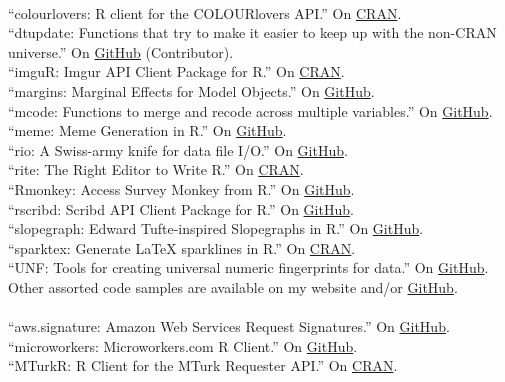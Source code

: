 \documentclass[12pt]{article}
\renewcommand{\section}[1]{\pagebreak[3]%
    \llap{\scshape\smash{\parbox[t]{\marginparwidth}{\raggedright {\color{lg}#1}}}}%
    \vspace{-\baselineskip}\par}
\newcommand{\topic}[1]{\pagebreak[3]\indent {\color{lg}{\footnotesize #1 }}\\}
\newcommand{\entry}[1]{\indent {\color{lg}\guillemotright}\hspace{2pt}#1\vspace{.25em}\\}
\begin{document}
\section{Software}
\topic{R packages}
\entry{``colourlovers: R client for the COLOURlovers API.'' On \href{http://cran.r-project.org/web/packages/colourlovers/index.html}{CRAN}.}
\entry{``dtupdate: Functions that try to make it easier to keep up with the non-CRAN universe.'' On \href{https://github.com/hrbrmstr/dtupdate}{GitHub} (Contributor).}
\entry{``imguR: Imgur API Client Package for R.'' On \href{http://cran.r-project.org/web/packages/imguR/index.html}{CRAN}.}
\entry{``margins: Marginal Effects for Model Objects.'' On \href{https://github.com/leeper/margins}{GitHub}.}
\entry{``mcode: Functions to merge and recode across multiple variables.'' On \href{https://github.com/leeper/mcode}{GitHub}.}
\entry{``meme: Meme Generation in R.'' On \href{https://github.com/leeper/meme}{GitHub}.}
\entry{``rio: A Swiss-army knife for data file I/O.'' On \href{https://github.com/leeper/rio}{GitHub}.}
\entry{``rite: The Right Editor to Write R.'' On \href{http://cran.r-project.org/web/packages/rite/index.html}{CRAN}.}
\entry{``Rmonkey: Access Survey Monkey from R.'' On \href{https://github.com/leeper/Rmonkey}{GitHub}.}
\entry{``rscribd: Scribd API Client Package for R.'' On \href{https://github.com/leeper/rscribd}{GitHub}.}
\entry{``slopegraph: Edward Tufte-inspired Slopegraphs in R.'' On \href{https://github.com/leeper/slopegraph}{GitHub}.}
\entry{``sparktex: Generate LaTeX sparklines in R.'' On \href{http://cran.r-project.org/web/packages/sparktex/index.html}{CRAN}.}
\entry{``UNF: Tools for creating universal numeric fingerprints for data.'' On \href{https://github.com/leeper/UNF}{GitHub}.}
\entry{Other assorted code samples are available on my website and/or \href{http://github.com/leeper}{GitHub}.}

\topic{R packages contributed to the cloudyr project}
\entry{``aws.signature: Amazon Web Services Request Signatures.'' On \href{https://github.com/cloudyr/aws.signature}{GitHub}.}
\entry{``microworkers: Microworkers.com R Client.'' On \href{https://github.com/leeper/microworkers}{GitHub}.}
\entry{``MTurkR: R Client for the MTurk Requester API.'' On \href{http://cran.r-project.org/web/packages/MTurkR/index.html}{CRAN}.}
\end{document}
